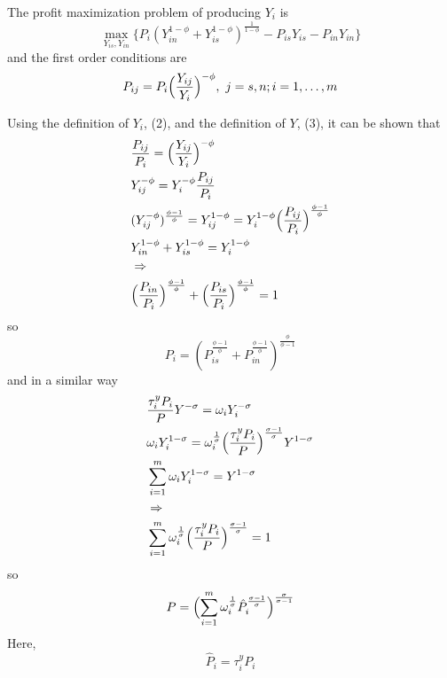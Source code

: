 \documentclass{article}
\begin{document}
    The profit maximization problem of producing $Y_i$ is
    \begin{equation*}
        \max_{Y_{is},Y_{in}} \{P_i (Y_{in}^{1-\phi}+Y_{is}^{1-\phi})^{\frac{1}{1-\phi}}-P_{is}Y_{is}-P_{in}Y_{in} \}
    \end{equation*}
    and the first order conditions are
    \begin{equation}
        P_{ij}=P_i \Bigl( \frac{Y_{ij}}{Y_i} \Bigr)^{-\phi},\ j=s,n; i=1,\dots,m
    \end{equation}

    Using the definition of $Y_i$, (2), and the definition of $Y$, (3), it can be shown that
    \begin{align*}
        &\frac{P_{ij}}{P_i}=\Bigl( \frac{Y_{ij}}{Y_i} \Bigr)^{-\phi}\\
        &Y_{ij}^{-\phi}=Y_i^{-\phi}\frac{P_{ij}}{P_i}\\
        &(Y_{ij}^{-\phi})^{\frac{\phi-1}{\phi}}=Y_{ij}^{1-\phi}=Y_i^{1-\phi} \Bigl( \frac{P_{ij}}{P_i} \Bigr)^{\frac{\phi-1}{\phi}}\\
        &Y_{in}^{1-\phi}+Y_{is}^{1-\phi}=Y_i^{1-\phi}\\
        &\Rightarrow\\
        &\Bigl( \frac{P_{in}}{P_i} \Bigr)^{\frac{\phi-1}{\phi}}+\Bigl( \frac{P_{is}}{P_i} \Bigr)^{\frac{\phi-1}{\phi}}=1\\
    \end{align*}
    so
    \begin{equation}
        P_i=(P_{is}^{\frac{\phi-1}{\phi}}+P_{in}^{\frac{\phi-1}{\phi}})^{\frac{\phi}{\phi-1}}
    \end{equation}
    and in a similar way
    \begin{align*}
        &\frac{\tau_i^y P_i}{P} Y^{-\sigma}=\omega_i Y_i^{-\sigma}\\
        &\omega_i Y_i^{1-\sigma}=\omega_i^{\frac{1}{\sigma}} \Bigl( \frac{\tau_i^y P_i}{P} \Bigr)^{\frac{\sigma-1}{\sigma}} Y^{1-\sigma}\\
        &\sum_{i=1}^m \omega_i Y_i^{1-\sigma}=Y^{1-\sigma}\\
        &\Rightarrow\\
        &\sum_{i=1}^m \omega_i^{\frac{1}{\sigma}} \Bigl( \frac{\tau_i^y P_i}{P} \Bigr)^{\frac{\sigma-1}{\sigma}}=1\\
    \end{align*}
    so
    \begin{equation}
        P=\Bigl( \sum_{i=1}^m \omega_i^{\frac{1}{\sigma}} \hat{P}_i^{\frac{\sigma-1}{\sigma}} \Bigr)^{\frac{\sigma}{\sigma-1}}
    \end{equation}
    Here,
    \begin{equation}
        \hat{P}_i=\tau_i^y P_i
    \end{equation}
\end{document}
